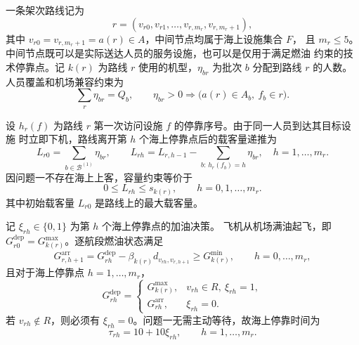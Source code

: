 \documentclass[UTF8,a4paper,zihao=5]{ctexart}
\begin{document}
一条架次路线记为
\begin{equation}
  r=(v_{r0},v_{r1},\ldots,v_{r,m_r},v_{r,m_r+1}),
  \label{eq:q1-route}
\end{equation}
其中 $v_{r0}=v_{r,m_r+1}=a(r)\in A$，中间节点均属于海上设施集合 $F$，
且 $m_r\le 5$。中间节点既可以是实际送达人员的服务设施，也可以是仅用于满足燃油
约束的技术停靠点。记 $k(r)$ 为路线 $r$ 使用的机型，$\eta_{br}$ 为批次 $b$
分配到路线 $r$ 的人数。人员覆盖和机场兼容约束为
\begin{equation}
  \sum_r\eta_{br}=Q_b,
  \qquad
  \eta_{br}>0\Rightarrow
  \bigl(a(r)\in A_b,\ f_b\in r\bigr).
  \label{eq:q1-demand-cover}
\end{equation}

设 $h_r(f)$ 为路线 $r$ 第一次访问设施 $f$ 的停靠序号。由于同一人员到达其目标设施
时立即下机，路线离开第 $h$ 个海上停靠点后的载客量递推为
\begin{equation}
  L_{r0}=\sum_{b\in\mathcal{B}^{(1)}}\eta_{br},
  \qquad
  L_{rh}=L_{r,h-1}-
  \sum_{b:\,h_r(f_b)=h}\eta_{br},
  \quad h=1,\ldots,m_r.
  \label{eq:q1-load}
\end{equation}
因问题一不存在海上上客，容量约束等价于
\begin{equation}
  0\le L_{rh}\le s_{k(r)},
  \qquad h=0,1,\ldots,m_r.
  \label{eq:q1-capacity}
\end{equation}
其中初始载客量 $L_{r0}$ 是路线上的最大载客量。

记 $\xi_{rh}\in\{0,1\}$ 为第 $h$ 个海上停靠点的加油决策。
飞机从机场满油起飞，即
$G_{r0}^{\mathrm{dep}}=G_{k(r)}^{\max}$。逐航段燃油状态满足
\begin{equation}
  G_{r,h+1}^{\mathrm{arr}}
  =G_{rh}^{\mathrm{dep}}
  -\beta_{k(r)}d_{v_{rh},v_{r,h+1}}
  \ge G_{k(r)}^{\min},
  \qquad h=0,\ldots,m_r,
  \label{eq:q1-fuel-arrival}
\end{equation}
且对于海上停靠点 $h=1,\ldots,m_r$，
\begin{equation}
  G_{rh}^{\mathrm{dep}}=
  \begin{cases}
    G_{k(r)}^{\max}, & v_{rh}\in R,\ \xi_{rh}=1,\\
    G_{rh}^{\mathrm{arr}}, & \xi_{rh}=0.
  \end{cases}
  \label{eq:q1-fuel-departure}
\end{equation}
若 $v_{rh}\notin R$，则必须有 $\xi_{rh}=0$。问题一无需主动等待，故海上停靠时间为
\begin{equation}
  \tau_{rh}=10+10\xi_{rh},
  \qquad h=1,\ldots,m_r.
  \label{eq:q1-dwell}
\end{equation}
\end{document}
